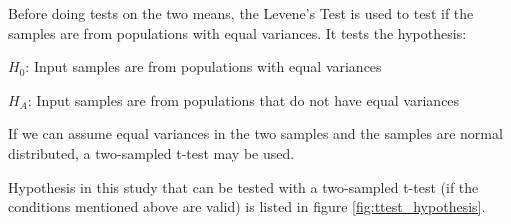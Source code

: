 Before doing tests on the two means, the Levene's Test is used to test if the samples are from populations with equal variances. It tests the hypothesis:\newline %

\centerline{$H_{0}$: Input samples are from populations with equal variances} 
\centerline{$H_{A}$: Input samples are from populations that do not have equal variances}
\vspace{0.2cm}
If we can assume equal variances in the two samples and the samples are normal distributed, a two-sampled t-test may be used. 


Hypothesis in this study that can be tested with a two-sampled t-test (if the conditions mentioned above are valid) is listed in figure \ref{fig:ttest_hypothesis}. 

